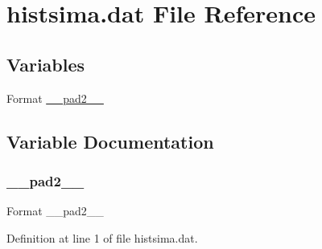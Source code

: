 \hypertarget{histsima_8dat}{}\section{histsima.\+dat File Reference}
\label{histsima_8dat}
\subsection*{Variables}
\begin{DoxyCompactItemize}
\item 
Format \hyperlink{histsima_8dat_ab9f9a0324921f2b035943e7f5250a945}{\+\_\+\+\_\+pad2\+\_\+\+\_\+}
\end{DoxyCompactItemize}


\subsection{Variable Documentation}
\mbox{\label{histsima_8dat_ab9f9a0324921f2b035943e7f5250a945}} 
\subsubsection{\texorpdfstring{\+\_\+\+\_\+pad2\+\_\+\+\_\+}{\_\_pad2\_\_}}
{\footnotesize\ttfamily Format \+\_\+\+\_\+pad2\+\_\+\+\_\+}



Definition at line 1 of file histsima.\+dat.

